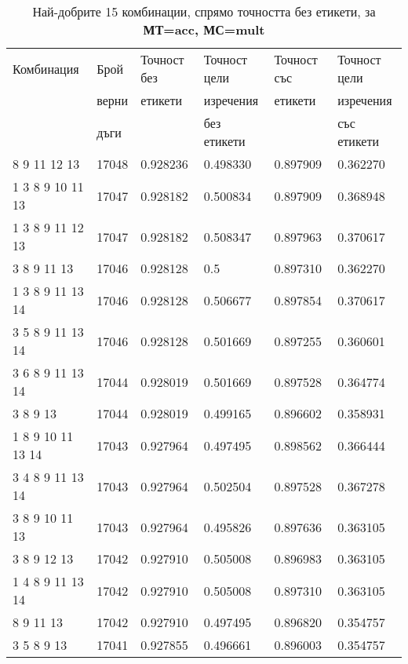 \begin{table}[!htb] 
\caption{Най-добрите 15 комбинации, спрямо точността без етикети, за \textbf{МТ=acc, МС=mult}}
  \begin{tabular}{|l|l|l|l|l|l|}
\hline 
Комбинация & Брой  & Точност без  & Точност цели  & Точност със  & Точност цели  \\
 & верни	& етикети & изречения & етикети & изречения \\
 & дъги	& 	& без етикети & 	& със етикети \\
\hline 
8 9 11 12 13 &	17048 &	0.928236 &	0.498330 &	0.897909 &	0.362270\\ 
\hline 
1 3 8 9 10 11 13 &	17047 &	0.928182 &	0.500834 &	0.897909 &	0.368948\\ 
\hline 
1 3 8 9 11 12 13 &	17047 &	0.928182 &	0.508347 &	0.897963 &	0.370617\\ 
\hline 
3 8 9 11 13 &	17046 &	0.928128 &	0.5 &	0.897310 &	0.362270\\ 
\hline 
1 3 8 9 11 13 14 &	17046 &	0.928128 &	0.506677 &	0.897854 &	0.370617\\ 
\hline 
3 5 8 9 11 13 14 &	17046 &	0.928128 &	0.501669 &	0.897255 &	0.360601\\ 
\hline 
3 6 8 9 11 13 14 &	17044 &	0.928019 &	0.501669 &	0.897528 &	0.364774\\ 
\hline 
3 8 9 13 &	17044 &	0.928019 &	0.499165 &	0.896602 &	0.358931\\ 
\hline 
1 8 9 10 11 13 14 &	17043 &	0.927964 &	0.497495 &	0.898562 &	0.366444\\ 
\hline 
3 4 8 9 11 13 14 &	17043 &	0.927964 &	0.502504 &	0.897528 &	0.367278\\ 
\hline 
3 8 9 10 11 13 &	17043 &	0.927964 &	0.495826 &	0.897636 &	0.363105\\ 
\hline 
3 8 9 12 13 &	17042 &	0.927910 &	0.505008 &	0.896983 &	0.363105\\ 
\hline 
1 4 8 9 11 13 14 &	17042 &	0.927910 &	0.505008 &	0.897310 &	0.363105\\ 
\hline 
8 9 11 13 &	17042 &	0.927910 &	0.497495 &	0.896820 &	0.354757\\ 
\hline 
3 5 8 9 13 &	17041 &	0.927855 &	0.496661 &	0.896003 &	0.354757\\ 
\hline 
 \end{tabular}
 \label{tab:lab_mult_acc}
 \end{table}
